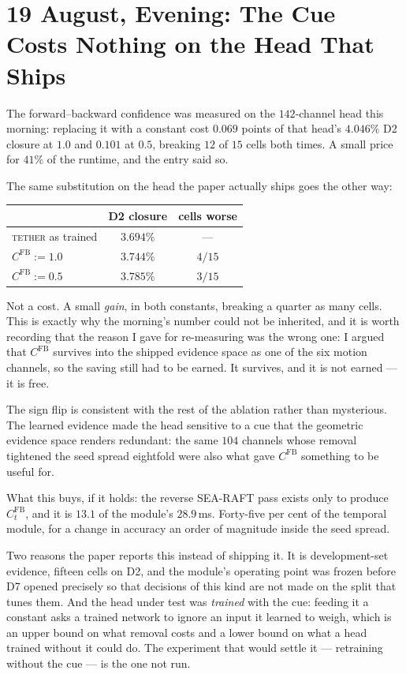 \documentclass[11pt,a4paper]{article}
\begin{document}
\section*{19 August, Evening: The Cue Costs Nothing on the Head That Ships}

The forward--backward confidence was measured on the $142$-channel head this
morning: replacing it with a constant cost $0.069$ points of that head's $4.046\%$
D2 closure at $1.0$ and $0.101$ at $0.5$, breaking $12$ of $15$ cells both times.
A small price for $41\%$ of the runtime, and the entry said so.

The same substitution on the head the paper actually ships goes the other way:

\begin{center}
\begin{tabular}{lcc}
\toprule
& D2 closure & cells worse \\
\midrule
\textsc{tether} as trained & $3.694\%$ & --- \\
$C^{\mathrm{FB}} := 1.0$ & $3.744\%$ & $4/15$ \\
$C^{\mathrm{FB}} := 0.5$ & $3.785\%$ & $3/15$ \\
\bottomrule
\end{tabular}
\end{center}

Not a cost. A small \emph{gain}, in both constants, breaking a quarter as many
cells. This is exactly why the morning's number could not be inherited, and it is
worth recording that the reason I gave for re-measuring was the wrong one: I argued
that $C^{\mathrm{FB}}$ survives into the shipped evidence space as one of the six
motion channels, so the saving still had to be earned. It survives, and it is not
earned --- it is free.

The sign flip is consistent with the rest of the ablation rather than mysterious.
The learned evidence made the head sensitive to a cue that the geometric evidence
space renders redundant: the same $104$ channels whose removal tightened the seed
spread eightfold were also what gave $C^{\mathrm{FB}}$ something to be useful for.

What this buys, if it holds: the reverse SEA-RAFT pass exists only to produce
$C^{\mathrm{FB}}_t$, and it is $13.1$ of the module's $28.9$\,ms. Forty-five per
cent of the temporal module, for a change in accuracy an order of magnitude inside
the seed spread.

Two reasons the paper reports this instead of shipping it. It is development-set
evidence, fifteen cells on D2, and the module's operating point was frozen before
D7 opened precisely so that decisions of this kind are not made on the split that
tunes them. And the head under test was \emph{trained} with the cue: feeding it a
constant asks a trained network to ignore an input it learned to weigh, which is an
upper bound on what removal costs and a lower bound on what a head trained without
it could do. The experiment that would settle it --- retraining without the cue ---
is the one not run.
\end{document}
